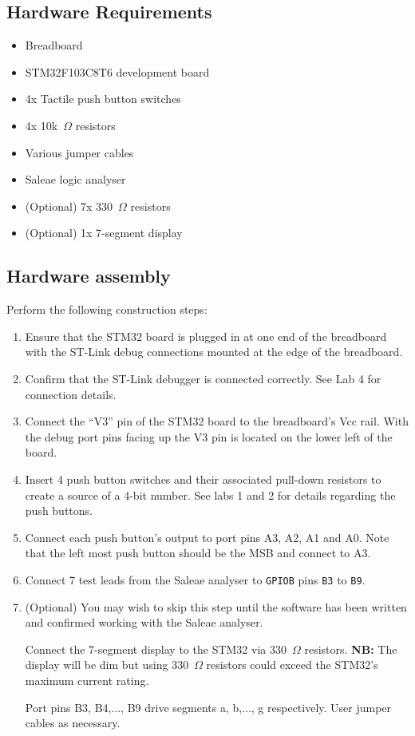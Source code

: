 \documentclass{UoNMCHA}
\numberwithin{equation}{section}
\begin{document}
\subsection{Hardware Requirements}

\begin{itemize}
    \item Breadboard
    \item STM32F103C8T6 development board
    \item 4x Tactile push button switches
    \item 4x 10k~$\Omega$ resistors
    \item Various jumper cables
    \item Saleae logic analyser
    \item (Optional) 7x 330~$\Omega$ resistors
    \item (Optional) 1x 7-segment display
\end{itemize}

\subsection{Hardware assembly}

Perform the following construction steps:

\begin{enumerate}
    \item Ensure that the STM32 board is plugged in at one end of the breadboard with the ST-Link debug connections mounted at the edge of the breadboard.
    \item Confirm that the ST-Link debugger is connected correctly. See Lab 4 for connection details.
    \item Connect the ``V3'' pin of the STM32 board to the breadboard's Vcc rail. With the debug port pins facing up the V3 pin is located on the lower left of the board.
    \item Insert 4 push button switches and their associated pull-down resistors to create a source of a 4-bit number. See labs 1 and 2 for details regarding the push buttons.
    \item Connect each push button's output to port pins A3, A2, A1 and A0. Note that the left most push button should be the MSB and connect to A3.
    \item Connect 7 test leads from the Saleae analyser to \texttt{GPIOB} pins \texttt{B3} to \texttt{B9}.
    \item (Optional) You may wish to skip this step until the software has been written and confirmed working with the Saleae analyser.
    
    Connect the 7-segment display to the STM32 via 330~$\Omega$ resistors. \textbf{NB:} The display will be dim but using 330~$\Omega$ resistors could exceed the STM32's maximum current rating.
    
    Port pins B3, B4,..., B9 drive segments a, b,..., g respectively. User jumper cables as necessary.
    

\end{enumerate}
\end{document}
